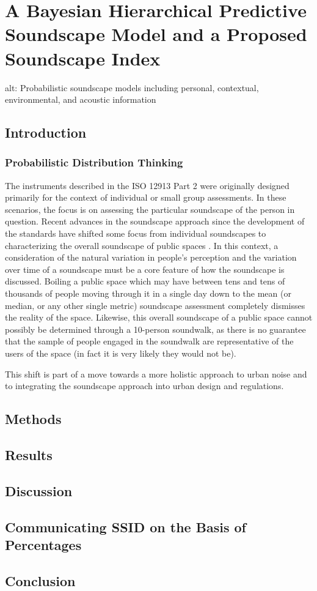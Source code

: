 \chapter{A Bayesian Hierarchical Predictive Soundscape Model and a Proposed Soundscape Index}
alt: Probabilistic soundscape models including personal, contextual, environmental, and acoustic information
\label{ch:bayes}

\section{Introduction}
 \subsection{Probabilistic Distribution Thinking}

   The instruments described in the ISO 12913 Part 2 \citet{ISO12913_2_2018IOS} were originally designed primarily for the context of individual or small group assessments. In these scenarios, the focus is on assessing the particular soundscape of the person in question. Recent advances in the soundscape approach since the development of the standards have shifted some focus from individual soundscapes to characterizing the overall soundscape of public spaces \citep{Mitchell2020Soundscape}. In this context, a consideration of the natural variation in people's perception and the variation over time of a soundscape must be a core feature of how the soundscape is discussed. Boiling a public space which may have between tens and tens of thousands of people moving through it in a single day down to the mean (or median, or any other single metric) soundscape assessment completely dismisses the reality of the space. Likewise, this overall soundscape of a public space cannot possibly be determined through a 10-person soundwalk, as there is no guarantee that the sample of people engaged in the soundwalk are representative of the users of the space (in fact it is very likely they would not be).

   This shift is part of a move towards a more holistic approach to urban noise and to integrating the soundscape approach into urban design and regulations.

\section{Methods}

\section{Results}

\section{Discussion}

\section{Communicating SSID on the Basis of Percentages}

\section{Conclusion}

